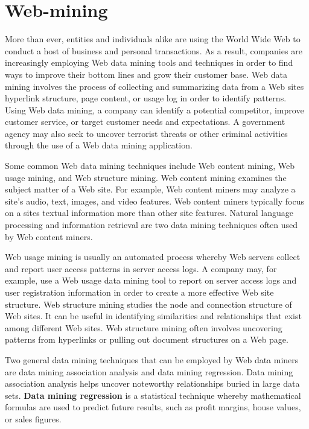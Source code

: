 \newpage
\section{Web-mining}
More than ever, entities and individuals alike are using the World Wide Web to conduct a host of business and personal transactions. As a result, companies are increasingly employing Web data mining tools and techniques in order to find ways to improve their bottom lines and grow their customer base. Web data mining involves the process of collecting and summarizing data from a Web sites hyperlink structure, page content, or usage log in order to identify patterns. Using Web data mining, a company can identify a potential competitor, improve customer service, or target customer needs and expectations. A government agency may also seek to uncover terrorist threats or other criminal activities through the use of a Web data mining application.

Some common Web data mining techniques include Web content mining, Web usage mining, and Web structure mining. Web content mining examines the subject matter of a Web site. For example, Web content miners may analyze a site's audio, text, images, and video features. Web content miners typically focus on a sites textual information more than other site features. Natural language processing and information retrieval are two data mining techniques often used by Web content miners.

Web usage mining is usually an automated process whereby Web servers collect and report user access patterns in server access logs. A company may, for example, use a Web usage data mining tool to report on server access logs and user registration information in order to create a more effective Web site structure. Web structure mining studies the node and connection structure of Web sites. It can be useful in identifying similarities and relationships that exist among different Web sites. Web structure mining often involves uncovering patterns from hyperlinks or pulling out document structures on a Web page.

Two general data mining techniques that can be employed by Web data miners are data mining association analysis and data mining regression. Data mining association analysis helps uncover noteworthy relationships buried in large data sets. \textbf{Data mining regression} is a statistical technique whereby mathematical formulas are used to predict future results, such as profit margins, house values, or sales figures.

